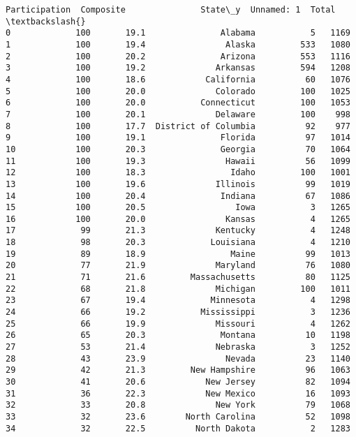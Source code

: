 \documentclass[11pt]{article}
\begin{document}
\begin{Verbatim}[commandchars=\\\{\}]
    Participation  Composite               State\_y  Unnamed: 1  Total  \textbackslash{}
0             100       19.1               Alabama           5   1169   
1             100       19.4                Alaska         533   1080   
2             100       20.2               Arizona         553   1116   
3             100       19.2              Arkansas         594   1208   
4             100       18.6            California          60   1076   
5             100       20.0              Colorado         100   1025   
6             100       20.0           Connecticut         100   1053   
7             100       20.1              Delaware         100    998   
8             100       17.7  District of Columbia          92    977   
9             100       19.1               Florida          97   1014   
10            100       20.3               Georgia          70   1064   
11            100       19.3                Hawaii          56   1099   
12            100       18.3                 Idaho         100   1001   
13            100       19.6              Illinois          99   1019   
14            100       20.4               Indiana          67   1086   
15            100       20.5                  Iowa           3   1265   
16            100       20.0                Kansas           4   1265   
17             99       21.3              Kentucky           4   1248   
18             98       20.3             Louisiana           4   1210   
19             89       18.9                 Maine          99   1013   
20             77       21.9              Maryland          76   1080   
21             71       21.6         Massachusetts          80   1125   
22             68       21.8              Michigan         100   1011   
23             67       19.4             Minnesota           4   1298   
24             66       19.2           Mississippi           3   1236   
25             66       19.9              Missouri           4   1262   
26             65       20.3               Montana          10   1198   
27             53       21.4              Nebraska           3   1252   
28             43       23.9                Nevada          23   1140   
29             42       21.3         New Hampshire          96   1063   
30             41       20.6            New Jersey          82   1094   
31             36       22.3            New Mexico          16   1093   
32             33       20.8              New York          79   1068   
33             32       23.6        North Carolina          52   1098   
34             32       22.5          North Dakota           2   1283   

\end{Verbatim}
\end{document}
